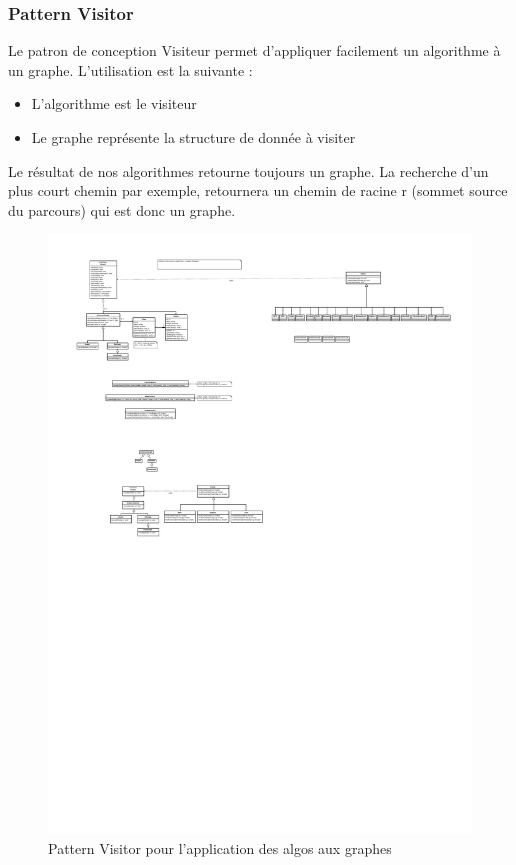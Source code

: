 \documentclass[french]{article}
\begin{document}
			\subsubsection{Pattern Visitor}
			Le patron de conception Visiteur permet d'appliquer facilement un algorithme à un graphe. L'utilisation est la suivante :
			\begin{itemize}
				\item L'algorithme est le visiteur
				\item Le graphe représente la structure de donnée à visiter
			\end{itemize}
			Le résultat de nos algorithmes retourne toujours un graphe. La recherche d'un plus court chemin par exemple, retournera un chemin de racine r (sommet source du parcours) qui est donc un graphe.\\
			
			\begin{figure}[H]
				\centering
				\includegraphics[scale=2.4]{Conception/visitor.pdf}
				\caption{Pattern Visitor pour l'application des algos aux graphes}
			\end{figure}
			
\end{document}
